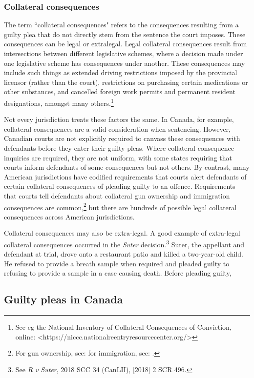 \subsubsection{Collateral consequences}

The term ``collateral consequences" refers to the consequences resulting from a guilty plea that do not directly stem from the sentence the court imposes. These consequences can be legal or extralegal. Legal collateral consequences result from intersections between different legislative schemes, where a decision made under one legislative scheme has consequences under another. These consequences may include such things as extended driving restrictions imposed by the provincial licensor (rather than the court), restrictions on purchasing certain medications or other substances, and cancelled foreign work permits and permanent resident designations, amongst many others.\footnote{See eg the National Inventory of Collateral Consequences of Conviction, online: \textless https://niccc.nationalreentryresourcecenter.org/\textgreater}

Not every jurisdiction treats these factors the same. In Canada, for example, collateral consequences are a valid consideration when sentencing. However, Canadian courts are not explicitly required to canvass these consequences with defendants before they enter their guilty pleas. Where collateral consequence inquiries are required, they are not uniform, with some states requiring that courts inform defendants of some consequences but not others. By contrast, many American jurisdictions have codified requirements that courts alert defendants of certain collateral consequences of pleading guilty to an offence. Requirements that courts tell defendants about collateral gun ownership and immigration consequences are common,\footnote{For gun ownership, see: for immigration, see: .} but there are hundreds of possible legal collateral consequences across American jurisdictions.

Collateral consequences may also be extra-legal. A good example of extra-legal collateral consequences occurred in the \textit{Suter} decision.\footnote{See \textit{R v Suter}, 2018 SCC 34 (CanLII), [2018] 2 SCR 496.} Suter, the appellant and defendant at trial, drove onto a restaurant patio and killed a two-year-old child. He refused to provide a breath sample when required and pleaded guilty to refusing to provide a sample in a case causing death. Before pleading guilty, 

\subsection{Guilty pleas in Canada}

